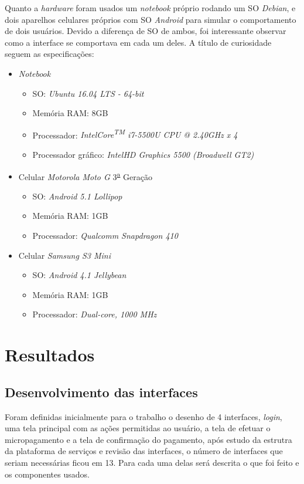 \documentclass[hidelinks,12pt]{article}
\begin{document}
Quanto a \textit{hardware} foram usados um \textit{notebook} pr\'oprio rodando um SO \textit{Debian}, e dois aparelhos celulares pr\'oprios com SO \textit{Android} para simular o comportamento de dois usu\'arios. Devido a diferen\c{c}a de SO de ambos, foi interessante observar como a interface se comportava em cada um deles. A t\'itulo de curiosidade seguem as especifica\c{c}\~oes:
\begin{itemize}
	\item \textit{Notebook}
	\begin{itemize}
		\item SO: \textit{Ubuntu 16.04 LTS - 64-bit}
		\item Mem\'oria RAM: 8GB
		\item Processador: \textit{Intel\textregistered Core\textsuperscript{TM} i7-5500U CPU @ 2.40GHz x 4}
		\item Processador gr\'afico: \textit{Intel\textregistered HD Graphics 5500 (Broadwell GT2)}
	\end{itemize}
	\item Celular \textit{Motorola Moto G} 3\textsuperscript{\underline{a}} Gera\c{c}\~ao
	\begin{itemize}
		\item SO: \textit{Android 5.1 Lollipop}
		\item Mem\'oria RAM: 1GB
		\item Processador: \textit{Qualcomm Snapdragon 410}
	\end{itemize}
	\item Celular \textit{Samsung S3 Mini}
	\begin{itemize}
		\item SO: \textit{Android 4.1 Jellybean}
		\item Mem\'oria RAM: 1GB
		\item Processador: \textit{Dual-core, 1000 MHz}
	\end{itemize}
\end{itemize}
\newpage
\section{Resultados}

\subsection{Desenvolvimento das interfaces} \label{learn}
Foram definidas inicialmente para o trabalho o desenho de 4 interfaces, \textit{login}, uma tela principal com as a\c{c}\~oes permitidas ao usu\'ario, a tela de efetuar o micropagamento e a tela de confirma\c{c}\~ao do pagamento, ap\'os estudo da estrutra da plataforma de servi\c{c}os e revis\~ao das interfaces, o n\'umero de interfaces que seriam necess\'arias ficou em 13. Para cada uma delas ser\'a descrita o que foi feito e os componentes usados.
\end{document}
